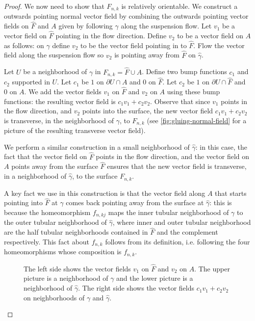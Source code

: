 \begin{proof}

  We now need to show that $F_{n,k}$ is relatively orientable. We construct a outwards pointing normal vector field by combining the outwards pointing vector fields on $\widehat{F}$ and $A$ given by following $\gamma$ along the suspension flow.  Let $v_1$ be a vector field on $\widehat{F}$ pointing in the flow direction.  Define $v_2$ to be a vector field on $A$ as follows: on $\gamma$ define $v_2$ to be the vector field pointing in to $\widehat{F}$.  Flow the vector field along the suspension flow so $v_2$ is pointing away from $\widehat{F}$ on $\widehat{\gamma}$.
  
Let $U$ be a neighborhood of $\gamma$ in $F_{n,k}=\widehat{F}\cup A$. Define two bump functions $c_1$ and $c_2$ supported in $U$.  Let $c_1$ be $1$ on $\partial U\cap A$ and $0$ on $\widehat{F}$. Let $c_2$ be $1$ on $\partial U\cap \widehat{F}$ and $0$ on $A$.
  We add the vector fields $v_1$ on $\widehat{F}$ and $v_2$ on $A$ using these bump functions: the resulting vector field is $c_1 v_1 + c_2 v_2$.
  Observe that since $v_1$ points in the flow direction, and $v_2$ points into the surface, the new vector field $c_1 v_1 + c_2 v_2$ is transverse, in the neighborhood of $\gamma$, to $F_{n,k}$ (see \autoref{fig:gluing-normal-field} for a picture of the resulting transverse vector field).

  We perform a similar construction in a small neighborhood of $\widehat{\gamma}$: in this case, the fact that the vector field on $\widehat{F}$ points in the flow direction, and the vector field on $A$ points away from the surface $\widehat{F}$ ensures that the new vector field is transverse, in a neighborhood of $\widehat{\gamma}$, to the surface $F_{n,k}$.

  A key fact we use in this construction is that the vector field along $A$ that starts pointing into $\widehat{F}$ at $\gamma$ comes back pointing away from the surface at $\widehat{\gamma}$: this is because the homeomorphism $f_{n,kj}$ maps the inner tubular neighborhood of $\gamma$ to the outer tubular neighborhood of $\widehat{\gamma}$, where inner and outer tubular neighborhood are the half tubular neighborhoods contained in $\widehat{F}$ and the complement respectively.
  This fact about $f_{n,k}$ follows from its definition, i.e. following the four homeomorphisms whose composition is $f_{n,k}$.
\begin{figure}[t]
  \centering
  \caption{The left side shows the vector fields $v_1$ on $\widehat{F}$ and $v_2$ on $A$.  The upper picture is a neighborhood of $\gamma$ and the lower picture is a neighborhood of $\widehat{\gamma}$.  The right side shows the vector fields $c_1v_1+c_2v_2$ on neighborhoods of $\gamma$ and $\widehat{\gamma}$.}
  \label{fig:gluing-normal-field}
\end{figure}


\end{proof}
